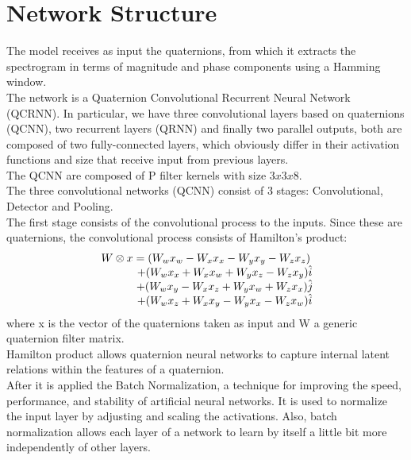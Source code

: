 \documentclass{article}
\begin{document}
    \section{Network Structure}
    The model receives as input the quaternions, from which it extracts the spectrogram in terms of magnitude and phase components 
    using a Hamming window.
    \\ The network is a Quaternion Convolutional Recurrent Neural Network (QCRNN).
    In particular, we have three convolutional layers based on quaternions (QCNN), two recurrent layers (QRNN) and finally two parallel 
    outputs, both are composed of two fully-connected layers, which obviously differ in their activation functions and size that 
    receive input from previous layers.
    \\ The QCNN are composed of P filter kernels with size $3x3x8$. 
    \\ The three convolutional networks (QCNN) consist of 3 stages: Convolutional, Detector and  Pooling.
    \\ The first stage consists of the convolutional process to the inputs. Since these are quaternions, the convolutional process 
    consists of Hamilton's product:
    \begin{equation*}
        \begin{matrix}
            W \otimes x =(W_wx_w - W_xx_x - W_yx_y - W_zx_z ) \\
               \hspace{1.2cm} + (W_wx_x + W_xx_w + W_yx_z - W_zx_y )\hat{i} \\
               \hspace{1.2cm} + (W_wx_y - W_xx_z + W_yx_w + W_zx_x )\hat{j} \\
               \hspace{1.2cm} + (W_wx_z + W_xx_y - W_yx_x - W_zx_w )\hat{i}
        \end{matrix}
    \end{equation*}
    where x is the vector of the quaternions taken as input and W a generic quaternion filter matrix.
    \\ Hamilton product allows quaternion neural networks to capture internal latent relations within the features of a quaternion.
    \\ After it is applied the Batch Normalization, a technique for improving the speed, performance, and stability of artificial 
    neural networks. It is used to normalize the input layer by adjusting and scaling the activations.
    Also, batch normalization allows each layer of a network to learn by itself a little bit more independently of other layers.
\end{document}
